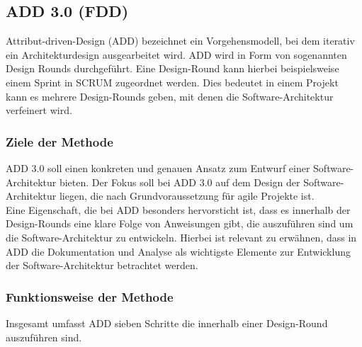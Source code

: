 \subsection{ADD 3.0 (FDD)}\label{add3}
Attribut-driven-Design (ADD) bezeichnet ein Vorgehensmodell, bei dem iterativ ein Architekturdesign ausgearbeitet wird. ADD wird in Form von sogenannten Design Rounds durchgeführt. Eine Design-Round kann hierbei beispielsweise einem Sprint in SCRUM zugeordnet werden. Dies bedeutet in einem Projekt kann es mehrere Design-Rounds geben, mit denen die Software-Architektur verfeinert wird. \\

\subsubsection{Ziele der Methode}
ADD 3.0 soll einen konkreten und genauen Ansatz zum Entwurf einer Software-Architektur bieten. Der Fokus soll bei ADD 3.0 auf dem Design der Software-Architektur liegen, die nach \cite{add} Grundvoraussetzung für agile Projekte ist.\\

Eine Eigenschaft, die bei ADD besonders hervorsticht ist, dass es innerhalb der Design-Rounds eine klare Folge von Anweisungen gibt, die auszuführen sind um die Software-Architektur zu entwickeln. Hierbei ist relevant zu erwähnen, dass in ADD die Dokumentation und Analyse als wichtigste Elemente zur Entwicklung der Software-Architektur betrachtet werden. \\

\subsubsection{Funktionsweise der Methode}
Insgesamt umfasst ADD sieben Schritte die innerhalb einer Design-Round auszuführen sind.\\

